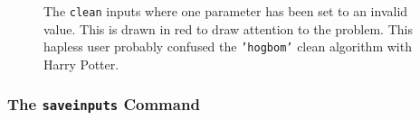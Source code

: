 \begin{figure}[h]
\begin{center}
\caption{\label{fig:inpclean3} The {\tt clean} inputs where
one parameter has been set to an invalid value.  This is
drawn in red to draw attention to the problem.  This hapless
user probably confused the {\tt 'hogbom'} clean algorithm 
with Harry Potter.
}
\hrulefill
\end{center}
\end{figure}


% 
% 
% 

\subsubsection{The {\tt saveinputs} Command}
\label{section:intro.tasks.setpar.saveinputs}

